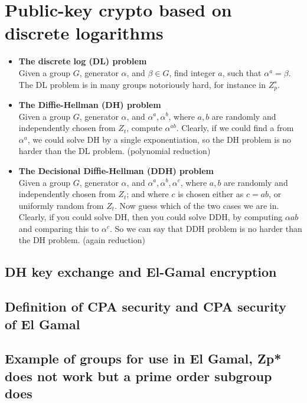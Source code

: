 \documentclass[a4paper,10pt]{article}
\begin{document}
\section*{Public-key crypto based on discrete logarithms}
\begin{itemize}
\item[] \textbf{The discrete log (DL) problem}\\
Given a group $G$, generator $\alpha$, and $\beta \in G$, find integer $a$, such that $\alpha^a = \beta$. The DL problem is in many groups notoriously hard, for instance in $Z^{∗}_p$.
\item[]\textbf{The Diffie-Hellman (DH) problem}\\
Given a group $G$, generator $\alpha$, and $\alpha^a,\alpha^b$, where $a,b$ are randomly and independently chosen from $Z_t$, compute $\alpha^{ab}$.
Clearly, if we could find a from $\alpha^a$, we could solve DH by a single exponentiation, so the DH problem is no harder than the DL problem. (polynomial reduction)
\item[] \textbf{The Decisional Diffie-Hellman (DDH) problem}\\
Given a group $G$, generator $\alpha$, and $\alpha^a,\alpha^b,\alpha^c$, where $a,b$ are randomly and independently chosen from $Z_t$; and where $c$ is chosen either as $c = ab$, or uniformly random from $Z_t$. Now guess which of the two cases we are in. Clearly, if you could solve DH, then you could solve DDH, by computing $\alpha{ab}$ and comparing this to $\alpha^c$. So we can say that DDH problem is no harder than the DH problem. (again reduction)
\end{itemize}
\subsection*{DH key exchange and El-Gamal encryption}
\subsection*{Definition of CPA security and CPA security of El Gamal}
\subsection*{Example of groups for use in El Gamal, Zp* does not work but a prime order subgroup does}
\end{document}
